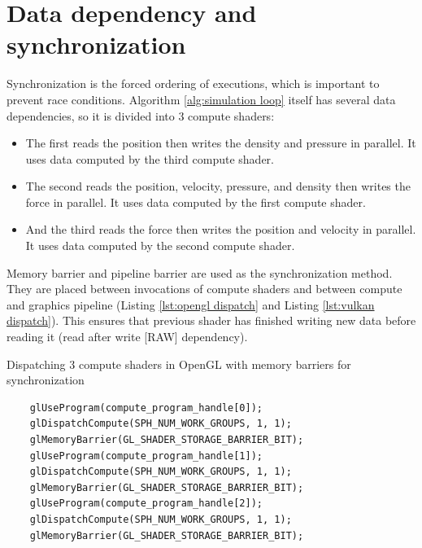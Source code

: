 \documentclass[a4paper, 12pt, oneside]{book}
\newenvironment{longlisting}{\captionsetup{type=listing}}{}
\begin{document}
\section{Data dependency and synchronization}

\begin{doublespace}
    Synchronization is the forced ordering of executions, which is important to prevent race conditions. Algorithm \ref{alg:simulation loop} itself has several data dependencies, so it is divided into 3 compute shaders:
    \begin{itemize}
        \item The first reads the position then writes the density and pressure in parallel. It uses data computed by the third compute shader.
        \item The second reads the position, velocity, pressure, and density then writes the force in parallel. It uses data computed by the first compute shader.
        \item And the third reads the force then writes the position and velocity in parallel. It uses data computed by the second compute shader.
    \end{itemize}
    
    Memory barrier and pipeline barrier are used as the synchronization method. They are placed between invocations of compute shaders and between compute and graphics pipeline (Listing \ref{lst:opengl dispatch} and Listing \ref{lst:vulkan dispatch}). This ensures that previous shader has finished writing new data before reading it (read after write [RAW] dependency).
\end{doublespace}

\begin{longlisting}
\caption{Dispatching 3 compute shaders in OpenGL with memory barriers for synchronization}
\label{lst:opengl dispatch}
\begin{verbatim}
    glUseProgram(compute_program_handle[0]);
    glDispatchCompute(SPH_NUM_WORK_GROUPS, 1, 1);
    glMemoryBarrier(GL_SHADER_STORAGE_BARRIER_BIT);
    glUseProgram(compute_program_handle[1]);
    glDispatchCompute(SPH_NUM_WORK_GROUPS, 1, 1);
    glMemoryBarrier(GL_SHADER_STORAGE_BARRIER_BIT);
    glUseProgram(compute_program_handle[2]);
    glDispatchCompute(SPH_NUM_WORK_GROUPS, 1, 1);
    glMemoryBarrier(GL_SHADER_STORAGE_BARRIER_BIT);
\end{verbatim}
\end{longlisting}
\end{document}
